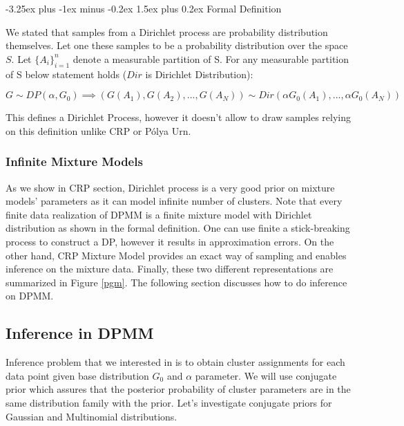 \documentclass[12pt, a4paper]{article}
\makeatletter
\renewcommand{\paragraph}{\@startsection{paragraph}{4}{0ex}%
    {-3.25ex plus -1ex minus -0.2ex}%
    {1.5ex plus 0.2ex}%
    {\normalfont\normalsize\bfseries}}
\makeatother
\begin{document}
\paragraph{Formal Definition}

We stated that samples from a Dirichlet process are probability
distribution themselves. Let one these samples to be a probability distribution over the space $S$. Let \(\{A_i\}_{i=1}^n\) denote a measurable partition of S. For
any measurable partition of S below statement holds (\(Dir\) is
Dirichlet Distribution):

\begin{equation*}
G \sim DP(\alpha,G_0) \implies  (G(A_1),G(A_2),...,G(A_N)) \sim Dir(\alpha G_0(A_1),...,\alpha G_0(A_N))
\end{equation*}

This defines a Dirichlet Process, however it doesn't allow to draw samples relying on this definition unlike CRP or Pólya Urn.


\subsubsection{Infinite Mixture Models}

As we show in CRP section, Dirichlet process is a very good prior on
mixture models' parameters as it can model infinite number of clusters.
Note that every finite data realization of DPMM is a finite mixture
model with Dirichlet distribution as shown in the formal definition. One can
use finite a stick-breaking process to construct a DP, however it results in
approximation errors. On the other hand, CRP Mixture Model provides an
exact way of sampling and enables inference on the mixture data. Finally,
these two different representations are summarized in Figure \ref{pgm}. The following section discusses how to
do inference on DPMM.




\subsection{Inference in DPMM}

Inference problem that we interested in is to obtain cluster assignments
for each data point given base distribution \(G_0\) and \(\alpha\)
parameter. We will use conjugate prior which assures that the posterior
probability of cluster parameters are in the same distribution family with
the prior. Let's investigate conjugate priors for Gaussian and
Multinomial distributions.
\end{document}
